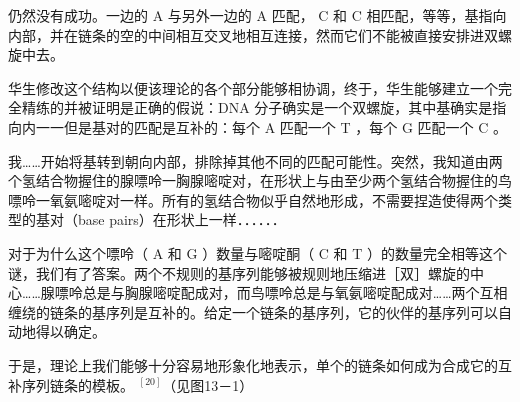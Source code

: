 仍然没有成功。一边的 A 与另外一边的 A 匹配， C 和 C 相匹配，等等，基指向内部，并在链条的空的中间相互交叉地相互连接，然而它们不能被直接安排进双螺旋中去。

华生修改这个结构以便该理论的各个部分能够相协调，终于，华生能够建立一个完全精练的并被证明是正确的假说：DNA 分子确实是一个双螺旋，其中基确实是指向内一一但是基对的匹配是互补的：每个 A 匹配一个 T ，每个 G 匹配一个 C 。

我……开始将基转到朝向内部，排除掉其他不同的匹配可能性。突然，我知道由两个氢结合物握住的腺嘌呤一胸腺嘧啶对，在形状上与由至少两个氢结合物握住的鸟嘌呤一氧氨嘧啶对一样。所有的氢结合物似乎自然地形成，不需要捏造使得两个类型的基对（base pairs）在形状上一样．．．．．．

对于为什么这个嘌呤（ A 和 G ）数量与嘧啶酮（ C 和 T ）的数量完全相等这个谜，我们有了答案。两个不规则的基序列能够被规则地压缩进［双］螺旋的中心……腺嘌呤总是与胸腺嘧啶配成对，而鸟嘌呤总是与氧氨嘧啶配成对……两个互相缠绕的链条的基序列是互补的。给定一个链条的基序列，它的伙伴的基序列可以自动地得以确定。

于是，理论上我们能够十分容易地形象化地表示，单个的链条如何成为合成它的互补序列链条的模板。 ${ }^{[20]}$（见图13－1）

